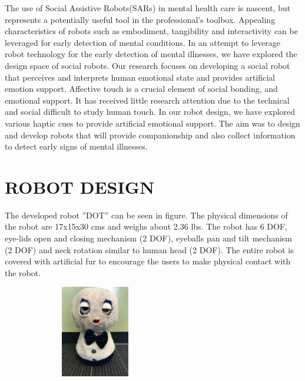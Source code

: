 \documentclass[letterpaper, 10 pt, conference]{ieeeconf}  %
\begin{document}
The use of Social Assistive Robots(SARs) in mental health care is nascent, but represents a potentially useful tool in the professional's toolbox. Appealing characteristics of robots such as embodiment, tangibility and interactivity can be leveraged for early detection of mental conditions. In an attempt to leverage robot technology for the early detection of mental illnesses, we have explored the design space of social robots. Our research focuses on developing a social robot that perceives and interprets human emotional state and provides artificial emotion support. Affective touch is a crucial element of social bonding, and emotional support. It has received little research attention due to the technical and social difficult to study human touch. In our robot design, we have explored various haptic cues to provide artificial emotional support. The aim was to design and develop robots that will provide companionship and also collect information to detect early signs of mental illnesses. 

\section{ROBOT DESIGN}

The developed robot ''DOT'' can be seen in figure. The physical dimensions of the robot are 17x15x30 cms and weighs about 2.36 lbs. The robot has 6 DOF, eye-lids open and closing mechanism (2 DOF), eyeballs pan and tilt mechanism (2 DOF) and neck rotation similar to human head (2 DOF). The entire robot is covered with artificial fur to encourage the users to make physical contact with the robot. %

\begin{figure}
\centering
    \includegraphics[width=6cm,height=4cm,angle=270]{IMG_8059.jpg}
\end{figure}
\end{document}
